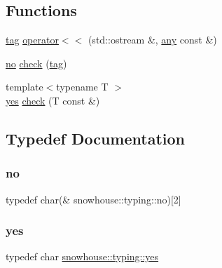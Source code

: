 \subsection*{Functions}
\begin{DoxyCompactItemize}
\item 
\mbox{\hyperlink{structsnowhouse_1_1typing_1_1tag}{tag}} \mbox{\hyperlink{namespacesnowhouse_1_1typing_aec82124576c20b7d8158d2255d495c6a}{operator$<$$<$}} (std\+::ostream \&, \mbox{\hyperlink{structsnowhouse_1_1typing_1_1any}{any}} const \&)
\item 
\mbox{\hyperlink{namespacesnowhouse_1_1typing_ad9bd8c4cca2c9f7de1faf7a7f53b1bda}{no}} \mbox{\hyperlink{namespacesnowhouse_1_1typing_a8d1fa0dba5f3c09df59b67e070ef6deb}{check}} (\mbox{\hyperlink{structsnowhouse_1_1typing_1_1tag}{tag}})
\item 
{\footnotesize template$<$typename T $>$ }\\\mbox{\hyperlink{namespacesnowhouse_1_1typing_a4b319cb7567ee3475023c05ed2dadb16}{yes}} \mbox{\hyperlink{namespacesnowhouse_1_1typing_a5587ff1cbc586105dd1feed91a6b5b4e}{check}} (T const \&)
\end{DoxyCompactItemize}


\subsection{Typedef Documentation}
\mbox{\label{namespacesnowhouse_1_1typing_ad9bd8c4cca2c9f7de1faf7a7f53b1bda}} 
\subsubsection{\texorpdfstring{no}{no}}
{\footnotesize\ttfamily typedef char(\& snowhouse\+::typing\+::no)\mbox{[}2\mbox{]}}

\mbox{\label{namespacesnowhouse_1_1typing_a4b319cb7567ee3475023c05ed2dadb16}} 
\subsubsection{\texorpdfstring{yes}{yes}}
{\footnotesize\ttfamily typedef char \mbox{\hyperlink{namespacesnowhouse_1_1typing_a4b319cb7567ee3475023c05ed2dadb16}{snowhouse\+::typing\+::yes}}}



